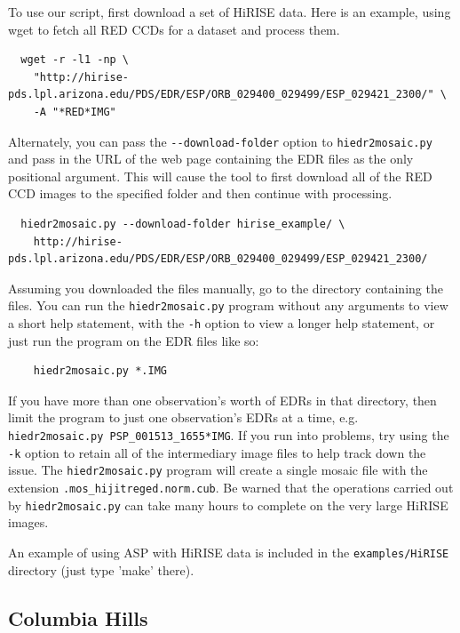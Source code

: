 To use our script, first download a set of HiRISE data. Here is
an example, using wget to fetch all RED CCDs for a dataset and
process them.

\begin{verbatim}
  wget -r -l1 -np \
    "http://hirise-pds.lpl.arizona.edu/PDS/EDR/ESP/ORB_029400_029499/ESP_029421_2300/" \
    -A "*RED*IMG"
\end{verbatim}

Alternately, you can pass the \texttt{-\/-download-folder} option to
\texttt{hiedr2mosaic.py} and pass in the URL of the web page containing the EDR
files as the only positional argument.  This will cause the tool to first download
all of the RED CCD images to the specified folder and then continue with processing.

\begin{verbatim}
  hiedr2mosaic.py --download-folder hirise_example/ \
    http://hirise-pds.lpl.arizona.edu/PDS/EDR/ESP/ORB_029400_029499/ESP_029421_2300/
\end{verbatim}

Assuming you downloaded the files manually, go to the directory containing the files. You can run the
\texttt{hiedr2mosaic.py} program without any arguments to view a short
help statement, with the \texttt{-h} option to view a longer help statement,
or just run the program on the EDR files like so:

\begin{verbatim}
    hiedr2mosaic.py *.IMG
\end{verbatim}

If you have more than one observation's worth of EDRs in that
directory, then limit the program to just one observation's EDRs
at a time, e.g. \texttt{hiedr2mosaic.py PSP\_001513\_1655*IMG}.  If you
run into problems, try using the \texttt{-k} option to retain all of
the intermediary image files to help track down the issue.  The
\texttt{hiedr2mosaic.py} program will create a single mosaic file
with the extension \texttt{.mos\_hijitreged.norm.cub}.  Be warned that
the operations carried out by \texttt{hiedr2mosaic.py} can take many
hours to complete on the very large HiRISE images.

An example of using ASP with HiRISE data is included in the
\texttt{examples/HiRISE} directory (just type 'make' there).

\subsection{Columbia Hills}

